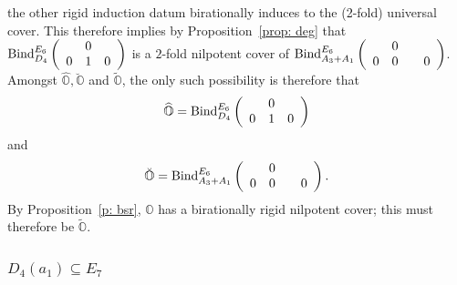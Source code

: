 \documentclass[11pt]{amsart}
\renewcommand{\O}{{\mathbb O}}
\newcommand{\BInd}{{{\mbox{\rm Bind}}}}
\newcommand{\covO}{\widetilde{\O}}
\newcommand{\hatO}{\widehat{\O}}
\newcommand{\breveO}{\breve{\O}}
\numberwithin{equation}{section}
\begin{document}
	the other rigid induction datum birationally induces to the (2-fold) universal cover. This therefore implies by Proposition~\ref{prop: deg} that $\BInd_{D_4}^{E_6}\left(\begin{array}{c c c}
		& 0 & \\
		0 & 1 & 0  \\
	\end{array}\right)$ is a $2$-fold nilpotent cover of $\BInd_{A_3 + A_1}^{E_6}\left(\begin{array}{c c c c}
		& 0 & & \\
		0 & 0 &  & 0 \\
	\end{array}\right)$. Amongst $\hatO, \breveO$ and $\covO$, the only such possibility is therefore that $$\hatO=\BInd_{D_4}^{E_6}\left(\begin{array}{c c c}
		& 0 & \\
		0 & 1 & 0  \\
	\end{array}\right)$$ and 
	$$\breveO=\BInd_{A_3 + 
		A_1}^{E_6}\left(\begin{array}{c c c c}
		& 0 & & \\
		0 & 0 &  & 0 \\
	\end{array}\right).$$ By Proposition~\ref{p: bsr}, $\O$ has a birationally rigid nilpotent cover; this must therefore be $\covO$.
	
	\subsubsection{\texorpdfstring{$D_4(a_1)\subseteq E_7$}{D4a1 in E7}}\label{sss: D4a1 in E7}
	
\end{document}
